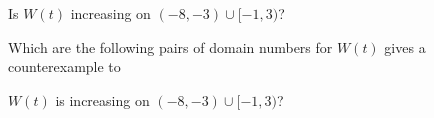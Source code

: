 \documentclass{ximera}
\begin{document}
\begin{exercise}  

Is $W(t)$ increasing on $(-8,-3) \cup [-1,3)$?

\begin{multipleChoice}
\end{multipleChoice}

\end{exercise}






\begin{exercise}  

Which are the following pairs of domain numbers for $W(t)$ gives a counterexample to 
\begin{center}
$W(t)$ is increasing on $(-8,-3) \cup [-1,3)$?
\end{center}



\begin{selectAll}
\end{selectAll}

\end{exercise}
\end{document}
